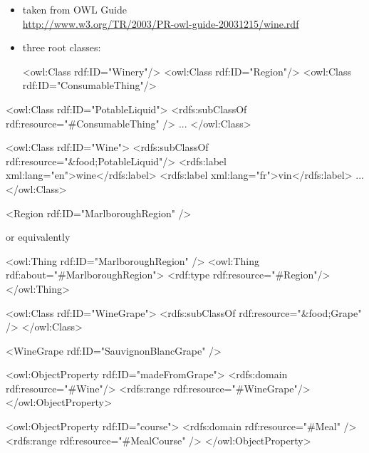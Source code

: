 \documentclass{sepslide-soa-faked} %
\begin{document}
\begin{slide}
\begin{itemize}
\item taken from OWL Guide \\
\url{http://www.w3.org/TR/2003/PR-owl-guide-20031215/wine.rdf} 
\item three root classes:
\begin{xml}
<owl:Class rdf:ID="Winery"/> 
<owl:Class rdf:ID="Region"/> 
<owl:Class rdf:ID="ConsumableThing"/> 
\end{xml}
\end{itemize}
\end{slide}

\begin{slide}
\begin{xml}
<owl:Class rdf:ID="PotableLiquid"> 
  <rdfs:subClassOf rdf:resource="#ConsumableThing" />
  ...
</owl:Class>

<owl:Class rdf:ID="Wine"> 
  <rdfs:subClassOf rdf:resource="&food;PotableLiquid"/> 
  <rdfs:label xml:lang="en">wine</rdfs:label> 
  <rdfs:label xml:lang="fr">vin</rdfs:label> 
  ...  
</owl:Class>  
\end{xml}
\end{slide}

\begin{slide}
\begin{xml}
<Region rdf:ID="MarlboroughRegion" /> 
\end{xml}
or equivalently
\begin{xml}
<owl:Thing rdf:ID="MarlboroughRegion" /> 
<owl:Thing rdf:about="#MarlboroughRegion"> 
   <rdf:type rdf:resource="#Region"/> 
</owl:Thing>
\end{xml}
\end{slide}

\begin{slide}
\begin{xml}
<owl:Class rdf:ID="WineGrape">
  <rdfs:subClassOf rdf:resource="&food;Grape" />
</owl:Class>

<WineGrape rdf:ID="SauvignonBlancGrape" />
\end{xml}
\end{slide}

\begin{slide}
\begin{xml}
<owl:ObjectProperty rdf:ID="madeFromGrape"> 
  <rdfs:domain rdf:resource="#Wine"/>
  <rdfs:range rdf:resource="#WineGrape"/> 
</owl:ObjectProperty> 

<owl:ObjectProperty rdf:ID="course">
  <rdfs:domain rdf:resource="#Meal" />
  <rdfs:range rdf:resource="#MealCourse" />
</owl:ObjectProperty>
\end{xml}
\end{slide}
\end{document}
